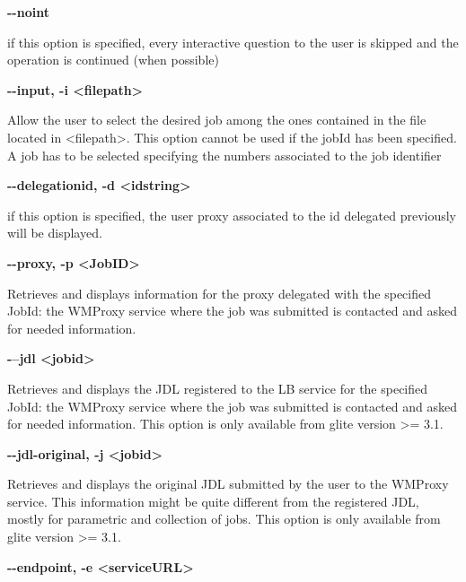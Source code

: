 \textbf{-{}-noint}

if this option is specified, every interactive question to the user is skipped and the operation is continued 
(when possible)





\textbf{-{}-input, -i <filepath>}

Allow the user to select the desired job among the ones contained in the file located in <filepath>. 
This option cannot be used if the jobId has been specified. A job has to be selected specifying 
the numbers associated to the job identifier





\textbf{-{}-delegationid, -d <idstring>}

if this option is specified, the user proxy associated to the id delegated previously will be displayed.





\textbf{-{}-proxy, -p <JobID>}

Retrieves and displays information for the proxy delegated with the specified JobId: 
the WMProxy service where the job was submitted is contacted and asked for needed information.





\textbf{-{}--jdl <jobid>}

Retrieves and displays the JDL registered to the LB service for the specified JobId: 
the WMProxy service where the job was submitted is contacted and asked for needed information.
This option is only available from glite version >= 3.1.





\textbf{-{}-jdl-original, -j <jobid>}

Retrieves and displays the original JDL submitted by the user to the WMProxy service. 
This information might be quite different from the registered JDL, mostly for parametric and collection of jobs.
This option is only available from glite version >= 3.1.





\textbf{-{}-endpoint, -e <serviceURL>}

